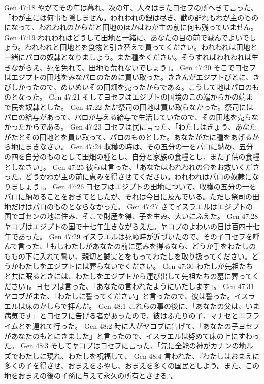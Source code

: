 Gen 47:18  やがてその年は暮れ、次の年、人々はまたヨセフの所へきて言った、「わが主には何事も隠しません。われわれの銀は尽き、獣の群れもわが主のものになって、われわれのからだと田地のほかはわが主の前に何も残っていません。
Gen 47:19  われわれはどうして田地と一緒に、あなたの目の前で滅んでよいでしょう。われわれと田地とを食物と引き替えで買ってください。われわれは田地と一緒にパロの奴隷となりましょう。また種をください。そうすればわれわれは生きながらえ、死を免れて、田地も荒れないでしょう」。
Gen 47:20  そこでヨセフはエジプトの田地をみなパロのために買い取った。ききんがエジプトびとに、きびしかったので、めいめいその田畑を売ったからである。こうして地はパロのものとなった。
Gen 47:21  そしてヨセフはエジプトの国境のこの端からかの端まで民を奴隷とした。
Gen 47:22  ただ祭司の田地は買い取らなかった。祭司にはパロの給与があって、パロが与える給与で生活していたので、その田地を売らなかったからである。
Gen 47:23  ヨセフは民に言った、「わたしはきょう、あなたがたとその田地とを買い取って、パロのものとした。あなたがたに種をあげるから地にまきなさい。
Gen 47:24  収穫の時は、その五分の一をパロに納め、五分の四を自分のものとして田畑の種とし、自分と家族の食糧とし、また子供の食糧としなさい」。
Gen 47:25  彼らは言った、「あなたはわれわれの命をお救いくださった。どうかわが主の前に恵みを得させてください。われわれはパロの奴隷になりましょう」。
Gen 47:26  ヨセフはエジプトの田地について、収穫の五分の一をパロに納めることをおきてとしたが、それは今日に及んでいる。ただし祭司の田地だけはパロのものとならなかった。
Gen 47:27  さてイスラエルはエジプトの国でゴセンの地に住み、そこで財産を得、子を生み、大いにふえた。
Gen 47:28  ヤコブはエジプトの国で十七年生きながらえた。ヤコブのよわいの日は百四十七年であった。
Gen 47:29  イスラエルは死ぬ時が近づいたので、その子ヨセフを呼んで言った、「もしわたしがあなたの前に恵みを得るなら、どうか手をわたしのももの下に入れて誓い、親切と誠実とをもってわたしを取り扱ってください。どうかわたしをエジプトには葬らないでください。
Gen 47:30  わたしが先祖たちと共に眠るときには、わたしをエジプトから運び出して先祖たちの墓に葬ってください」。ヨセフは言った、「あなたの言われたようにいたします」。
Gen 47:31  ヤコブがまた、「わたしに誓ってください」と言ったので、彼は誓った。イスラエルは床のかしらで拝んだ。
Gen 48:1  これらの事の後に、「あなたの父は、いま病気です」とヨセフに告げる者があったので、彼はふたりの子、マナセとエフライムとを連れて行った。
Gen 48:2  時に人がヤコブに告げて、「あなたの子ヨセフがあなたのもとにきました」と言ったので、イスラエルは努めて床の上にすわった。
Gen 48:3  そしてヤコブはヨセフに言った、「先に全能の神がカナンの地ルズでわたしに現れ、わたしを祝福して、
Gen 48:4  言われた、『わたしはおまえに多くの子を得させ、おまえをふやし、おまえを多くの国民としよう。また、この地をおまえの後の子孫に与えて永久の所有とさせる』。
